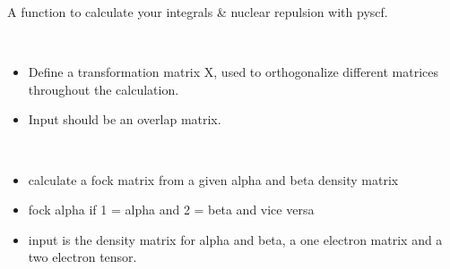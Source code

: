 \documentclass[letterpaper,10pt,english]{sphinxmanual}
\begin{document}

\begin{fulllineitems}
\label{\detokenize{SCF_functions:hf.utilities.SCF_functions.get_integrals_pyscf}}
A function to calculate your integrals \& nuclear repulsion with pyscf.

\end{fulllineitems}


\begin{fulllineitems}
\label{\detokenize{SCF_functions:hf.utilities.SCF_functions.trans_matrix}}~\begin{itemize}
\item {} 
Define a transformation matrix X, used to orthogonalize different matrices throughout the calculation.

\item {} 
Input should be an overlap matrix.

\end{itemize}

\end{fulllineitems}


\begin{fulllineitems}
\label{\detokenize{SCF_functions:hf.utilities.SCF_functions.uhf_fock_matrix}}~\begin{itemize}
\item {} 
calculate a fock matrix from a given alpha and beta density matrix

\item {} 
fock alpha if 1 = alpha and 2 = beta and vice versa

\item {} 
input is the density matrix for alpha and beta, a one electron matrix and a two electron tensor.

\end{itemize}

\end{fulllineitems}
\end{document}
